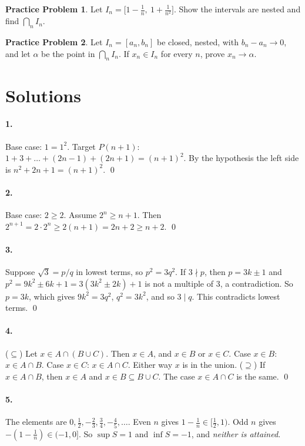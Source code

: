 \documentclass[11pt]{article}
\theoremstyle{definition}
\newtheorem{prob}{Practice Problem}
\begin{document}
\begin{prob}\label{prob:n2}
Let $I_n=\bigl[1-\frac1n,\ 1+\frac1{n^2}\bigr]$. Show the intervals are
nested and find $\bigcap_nI_n$.
\end{prob}

\begin{prob}\label{prob:n3}
Let $I_n=[a_n,b_n]$ be closed, nested, with $b_n-a_n\to0$, and let $\alpha$
be the point in $\bigcap_nI_n$. If $x_n\in I_n$ for every $n$, prove
$x_n\to\alpha$.
\end{prob}

\newpage
\section{Solutions}
\label{sec:solutions}

\paragraph{1.} Base case: $1=1^2$. Target $P(n+1)$:
$1+3+\dots+(2n-1)+(2n+1)=(n+1)^2$. By the hypothesis the left side is
$n^2+2n+1=(n+1)^2$. \qed

\paragraph{2.} Base case: $2\ge2$. Assume $2^n\ge n+1$. Then
$2^{n+1}=2\cdot2^n\ge2(n+1)=2n+2\ge n+2$. \qed

\paragraph{3.} Suppose $\sqrt3=p/q$ in lowest terms, so $p^2=3q^2$. If
$3\nmid p$, then $p=3k\pm1$ and $p^2=9k^2\pm6k+1=3(3k^2\pm2k)+1$ is not a
multiple of 3, a contradiction. So $p=3k$, which gives $9k^2=3q^2$,
$q^2=3k^2$, and so $3\mid q$. This contradicts lowest terms. \qed

\paragraph{4.} ($\subseteq$) Let $x\in A\cap(B\cup C)$. Then $x\in A$, and
$x\in B$ or $x\in C$. Case $x\in B$: $x\in A\cap B$. Case $x\in C$:
$x\in A\cap C$. Either way $x$ is in the union.
($\supseteq$) If $x\in A\cap B$, then $x\in A$ and $x\in B\subseteq B\cup C$.
The case $x\in A\cap C$ is the same. \qed

\paragraph{5.} The elements are $0,\frac12,-\frac23,\frac34,-\frac45,\dots$.
Even $n$ gives $1-\frac1n\in[\frac12,1)$. Odd $n$ gives
$-(1-\frac1n)\in(-1,0]$. So $\sup S=1$ and $\inf S=-1$, and \emph{neither
is attained}.
\end{document}
